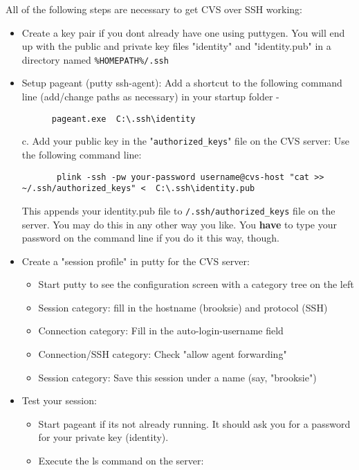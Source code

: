 \documentclass{book}
\def\t#1{{\tt #1}}
\begin{document}
All of the following steps are necessary to get CVS over SSH working:
\begin{itemize}
\item Create a key pair if you dont already have one using puttygen. You will
end up with the public and private key files "identity" and "identity.pub" in
a directory named \t{\%HOMEPATH\%/.ssh}

\item Setup pageant (putty ssh-agent): Add a shortcut to the following command
line (add/change paths as necessary) in your startup folder -

\begin{verbatim}
      pageant.exe  C:\.ssh\identity 
\end{verbatim}

c. Add your public key in the "\t{authorized\_keys}" file on the CVS server:
   Use the following command line:

\begin{verbatim}
       plink -ssh -pw your-password username@cvs-host "cat >> ~/.ssh/authorized_keys" <  C:\.ssh\identity.pub
\end{verbatim}
  
   This appends your identity.pub file to \t{\home{}/.ssh/authorized\_keys} file
   on the server. You may do this in any other way you like. You {\bf have} to
   type your password on the command line if you do it this way, though.

\item Create a "session profile" in putty for the CVS server:
  \begin{itemize}
  \item Start putty to see the configuration screen with a category tree on
   the left 
  \item Session category: fill in the hostname (brooksie) and protocol (SSH) 
  \item Connection category: Fill in the auto-login-username field
  \item Connection/SSH category: Check "allow agent forwarding"
  \item Session category: Save this session under a name (say, "brooksie")
  \end{itemize}


\item Test your session:
  \begin{itemize}
  \item Start pageant if its not already running. It should ask you for a
    password for your private key (identity). 
  \item Execute the ls command on the server:


\end{itemize}
\end{itemize}
\end{document}
